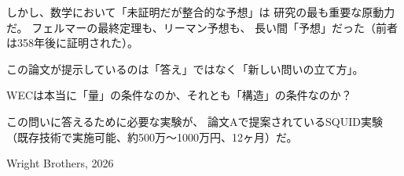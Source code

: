 \documentclass[12pt,a4paper]{article}
\begin{document}
しかし、数学において「未証明だが整合的な予想」は
研究の最も重要な原動力だ。
フェルマーの最終定理も、リーマン予想も、
長い間「予想」だった（前者は358年後に証明された）。

この論文が提示しているのは「答え」ではなく「新しい問いの立て方」。

WECは本当に「量」の条件なのか、それとも「構造」の条件なのか？

この問いに答えるために必要な実験が、
論文Aで提案されているSQUID実験
（既存技術で実施可能、約500万〜1000万円、12ヶ月）だ。

\vfill
\begin{center}
{\small Wright Brothers, 2026}
\end{center}
\end{document}
